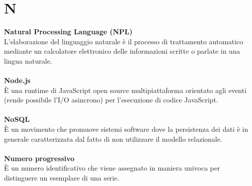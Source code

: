 \section{N}
\textbf{Natural Processing Language (NPL)}\\
L'elaborazione del linguaggio naturale è il processo di trattamento automatico mediante un calcolatore elettronico delle informazioni scritte o parlate in una lingua naturale. \\ \\
\textbf{Node.js}\\
È una runtime di JavaScript open source multipiattaforma orientato agli eventi (rende possibile l’I/O asincrono) per l'esecuzione di codice JavaScript. \\ \\
\textbf{NoSQL}\\
È un movimento che promuove sistemi software dove la persistenza dei dati è in generale caratterizzata dal fatto di non utilizzare il modello relazionale. \\ \\
\textbf{Numero progressivo}\\ 
È un numero identificativo che viene assegnato in maniera univoca per distinguere un esemplare di una serie. \\ \\
\clearpage